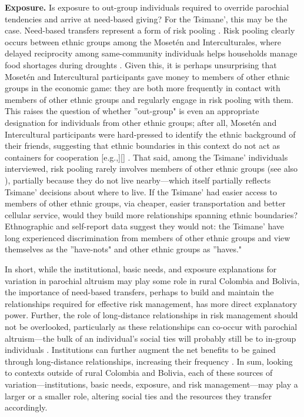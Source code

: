\documentclass[bibauthoryear]{aa}
\begin{document}
\textbf{Exposure.} Is exposure to out-group individuals required to override parochial tendencies and arrive at need-based giving? For the Tsimane', this may be the case. Need-based transfers represent a form of risk pooling \citep{cronk2019managing}. Risk pooling clearly occurs between ethnic groups among the Moset\'en and Interculturales, where delayed reciprocity among same-community individuals helps households manage food shortages during droughts \citep{pisorjones2020}. Given this, it is perhaps unsurprising that Moset\'en and Intercultural participants gave money to members of other ethnic groups in the economic game: they are both more frequently in contact with members of other ethnic groups and regularly engage in risk pooling with them. This raises the question of whether ''out-group" is even an appropriate designation for individuals from other ethnic groups; after all, Moset\'en and Intercultural participants were hard-pressed to identify the ethnic background of their friends, suggesting that ethnic boundaries in this context do not act as containers for cooperation [e.g.,][] \citep{brewer1976ethnocentrism, moya2015different}. That said, among the Tsimane' individuals interviewed, risk pooling rarely involves members of other ethnic groups (see also \citet{jaeggi2016reciprocal}), partially because they do not live nearby---which itself partially reflects Tsimane' decisions about where to live. If the Tsimane' had easier access to members of other ethnic groups, via cheaper, easier transportation and better cellular service, would they build more relationships spanning ethnic boundaries? Ethnographic and self-report data suggest they would not: the Tsimane' have long experienced discrimination from members of other ethnic groups and view themselves as the ''have-nots" and other ethnic groups as ''haves."

In short, while the institutional, basic needs, and exposure explanations for variation in parochial altruism may play some role in rural Colombia and Bolivia, the importance of need-based transfers, perhaps to build and maintain the relationships required for effective risk management, has more direct explanatory power. Further, the role of long-distance relationships in risk management should not be overlooked, particularly as these relationships can co-occur with parochial altruism---the bulk of an individual's social ties will probably still be to in-group individuals \citep{bollig1993intra, brewer1976ethnocentrism, lathrap1973antiquity, bowles2004persistent}. Institutions can further augment the net benefits to be gained through long-distance relationships, increasing their frequency \citep{pisor2019evolution}. In sum, looking to contexts outside of rural Colombia and Bolivia, each of these sources of variation---institutions, basic needs, exposure, and risk management---may play a larger or a smaller role, altering social ties and the resources they transfer accordingly.
\end{document}
